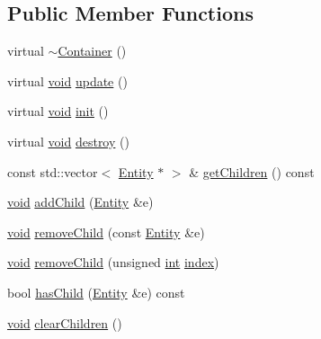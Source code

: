 \subsection*{Public Member Functions}
\begin{DoxyCompactItemize}
\item 
virtual \hyperlink{classmc_1_1_container_ae9a0af1e1ea151ba9f5654b4f3a5494b}{$\sim$\+Container} ()
\item 
virtual \hyperlink{_s_d_l__opengles2__gl2ext_8h_ae5d8fa23ad07c48bb609509eae494c95}{void} \hyperlink{classmc_1_1_container_a306bb7d15cee23ff8bef4b9342ed85cf}{update} ()
\item 
virtual \hyperlink{_s_d_l__opengles2__gl2ext_8h_ae5d8fa23ad07c48bb609509eae494c95}{void} \hyperlink{classmc_1_1_container_a087d26907d06163aa731d9a313163b7f}{init} ()
\item 
virtual \hyperlink{_s_d_l__opengles2__gl2ext_8h_ae5d8fa23ad07c48bb609509eae494c95}{void} \hyperlink{classmc_1_1_container_a80bd71e4e12ec218e4de88f4e48cc771}{destroy} ()
\item 
const std\+::vector$<$ \hyperlink{classmc_1_1_entity}{Entity} $\ast$ $>$ \& \hyperlink{classmc_1_1_container_a2455ff127249ab0b128fe54eeeaf72e3}{get\+Children} () const 
\item 
\hyperlink{_s_d_l__opengles2__gl2ext_8h_ae5d8fa23ad07c48bb609509eae494c95}{void} \hyperlink{classmc_1_1_container_a7de8a7bfe45c8a869149de774019e42c}{add\+Child} (\hyperlink{classmc_1_1_entity}{Entity} \&e)
\item 
\hyperlink{_s_d_l__opengles2__gl2ext_8h_ae5d8fa23ad07c48bb609509eae494c95}{void} \hyperlink{classmc_1_1_container_ab11d68dc07cd15d6a8a30f63fb8aaa62}{remove\+Child} (const \hyperlink{classmc_1_1_entity}{Entity} \&e)
\item 
\hyperlink{_s_d_l__opengles2__gl2ext_8h_ae5d8fa23ad07c48bb609509eae494c95}{void} \hyperlink{classmc_1_1_container_a2a20247458c80d432a9c7d80f11a15ff}{remove\+Child} (unsigned \hyperlink{_s_d_l__thread_8h_a6a64f9be4433e4de6e2f2f548cf3c08e}{int} \hyperlink{_s_d_l__opengl__glext_8h_a57f14e05b1900f16a2da82ade47d0c6d}{index})
\item 
bool \hyperlink{classmc_1_1_container_a0f947d9066f457d37defd9382da99128}{has\+Child} (\hyperlink{classmc_1_1_entity}{Entity} \&e) const 
\item 
\hyperlink{_s_d_l__opengles2__gl2ext_8h_ae5d8fa23ad07c48bb609509eae494c95}{void} \hyperlink{classmc_1_1_container_aee8b37e3cb3ef52d2b3aee2310007f39}{clear\+Children} ()
\item 

\end{DoxyCompactItemize}
